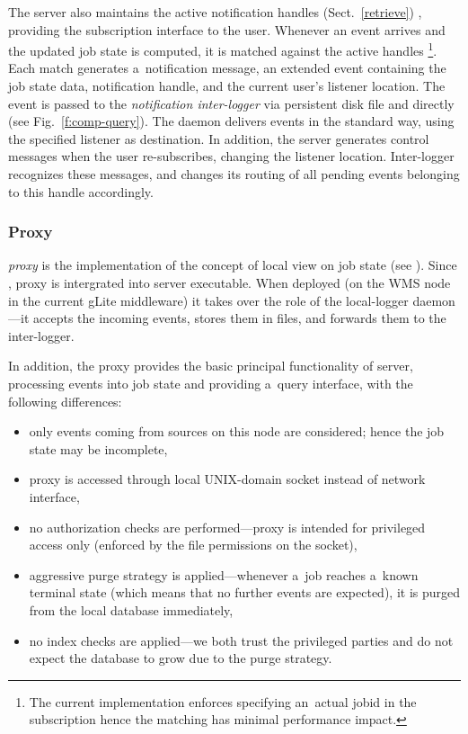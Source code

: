 The server also maintains the active notification handles%
\ifx\insideUG\undefined\relax\else
(Sect.~\ref{retrieve})
\fi
, providing the subscription interface to the user.
Whenever an event arrives and the updated job state is computed,
it is matched against the active handles%
\footnote{The current implementation enforces specifying an~actual jobid
in the subscription hence the matching has minimal performance impact.}.
Each match generates a~notification message, an extended \LB event
containing the job state data, notification handle,
and the current user's listener location.
The event is passed to the \emph{notification inter-logger} 
via persistent disk file and directly (see Fig.~\ref{f:comp-query}).
The daemon delivers events in the standard way, using the specified
listener as destination.
In addition, the server generates control messages when the user re-subscribes,
changing the listener location.
Inter-logger recognizes these messages, and changes its routing of all
pending events belonging to this handle accordingly.



\subsubsection{Proxy}
\label{s:proxy}

\emph{\LB proxy} is the implementation of the concept of local view on job state (see
\ifx\insideUG{}\fi). Since
, \LB proxy is intergrated into \LB server executable.  When deployed (on
the WMS node in the current gLite middleware) it takes over the role of the
local-logger daemon---it accepts the incoming events, stores them in files, and
forwards them to the inter-logger.

In addition, the proxy provides the basic principal functionality of \LB server,
\ie processing events into job state and providing a~query interface,
with the following differences:
\begin{itemize}
\item only events coming from sources on this node are considered; hence
the job state may be incomplete,
\item proxy is accessed through local UNIX-domain socket instead of network
interface,
\item no authorization checks are performed---proxy is intended for
privileged access only (enforced by the file permissions on the socket),
\item aggressive purge strategy is applied---whenever a~job reaches
a~known terminal state (which means that no further events are expected), it is purged
from the local database immediately,
\item no index checks are applied---we both trust the privileged parties
and do not expect the database to grow due to the purge strategy.
\end{itemize}

